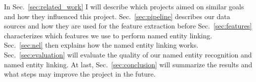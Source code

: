 In Sec.~\ref{sec:related_work} I will describe which projects aimed on similar goals and how they influenced this project. Sec.~\ref{sec:pipeline} describes our data sources and how they are used for the feature extraction before Sec.~\ref{sec:features} characterizes which features we use to perform named entity linking. Sec.~\ref{sec:nel} then explains how the named entity linking works. Sec.~\ref{sec:evaluation} will evaluate the quality of our named entity recognition and named entity linking. At last, Sec.~\ref{sec:conclusion} will summarize the results and what steps may improve the project in the future.